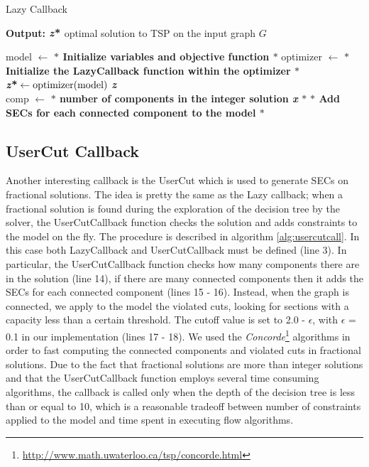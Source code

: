 \begin{algorithm}
    \caption{Lazy Callback}\label{Lazy Callback}
    \hspace*{\algorithmicindent} \textbf{Output:} $\textbf{\textit{z}\text{*}} $ optimal solution to TSP on the input graph $G$
    \begin{algorithmic}[1]
  \State model $ \leftarrow $ \textbf{$\ast$ Initialize variables and objective function $\ast$ }
  \State optimizer $ \leftarrow $ \textbf{$\ast$ Initialize the LazyCallback function within the optimizer $\ast$ }
  \State $\textbf{\textit{z}\text{*}} \gets \text{optimizer(model)}$
  \State \Return \textbf{\textit{z}\text{*}}
\EndFunction
\\
  \State comp $ \leftarrow $ \textbf{$\ast$ number of components in the integer solution \textit{x} $\ast$ }
	\State \textbf{ $\ast$ Add SECs for each connected component to the model $\ast$ }
	\EndIf  
	\State \Return 
	\EndFunction

    \end{algorithmic}
     \label{alg:lazycall}
    \end{algorithm}

\subsection{UserCut Callback}
Another interesting callback is the UserCut which is used to generate SECs on fractional solutions. The idea is pretty the same as the Lazy callback; when a fractional solution is found during the exploration of the decision tree by the solver, the UserCutCallback function checks the solution and adds constraints to the model on the fly. The procedure is described in algorithm \ref{alg:usercutcall}. In this case both LazyCallback and UserCutCallback must be defined (line 3). In particular, the UserCutCallback function checks how many components there are in the solution (line 14), if there are many connected components then it adds the SECs for each connected component (lines 15 - 16). Instead, when the graph is connected, we apply to the model the violated cuts, looking for sections with a capacity less than a certain threshold. The cutoff value is set to 2.0 - $\epsilon$, with $\epsilon$ = 0.1 in our implementation (lines 17 - 18). We used the \textit{Concorde}\footnote{\url{http://www.math.uwaterloo.ca/tsp/concorde.html}} algorithms in order to fast computing the connected components and violated cuts in fractional solutions. Due to the fact that fractional solutions are more than integer solutions and that the UserCutCallback function employs several time consuming algorithms, the callback is called only when the depth of the decision tree is less than or equal to 10, which is a reasonable tradeoff between number of constraints applied to the model and time spent in executing flow algorithms.



